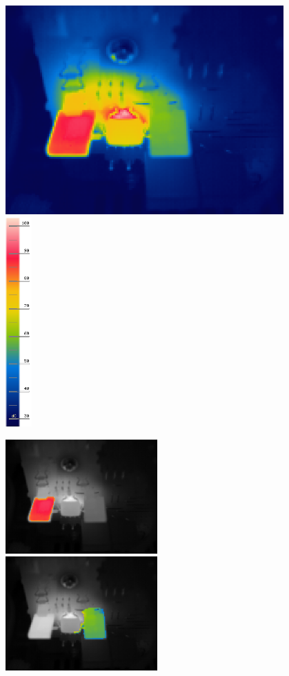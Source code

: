 \documentclass[a4paper,twoside]{report}
\begin{document}
\begin{figure}[hptb!]
 \centering
 \includegraphics[height=8cm, keepaspectratio=true]{img_report/IR_6357}
 \includegraphics[height=8cm, keepaspectratio=true]{img_report/IR_6357_scale}

 \vspace*{2mm}
 \includegraphics[height=4.36cm, keepaspectratio=true]{img_report/q7009}
 \includegraphics[height=4.36cm, keepaspectratio=true]{img_report/q7007}


\end{figure}
\end{document}
